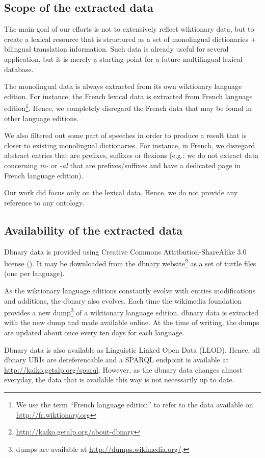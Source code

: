 \documentclass[sw]{iosart2c}
\begin{document}
\subsection{Scope of the extracted data}

The main goal of our efforts is not to extensively reflect wiktionary data, but to create a lexical resource that is structured as a set of monolingual dictionaries + bilingual translation information. Such data is already useful for several application, but it is merely a starting point for a future multilingual lexical database.

The monolingual data is always extracted from its own wiktionary language edition. For instance, the French lexical data is extracted from French language edition\footnote{We use the term ``French language edition'' to refer to the data available on \url{http://fr.wiktionary.org}}. Hence, we completely disregard the French data that may be found in other language editions.

We also filtered out some part of speeches in order to produce a result that is closer to existing monolingual dictionaries. For instance, in French, we disregard abstract entries that are prefixes, suffixes or flexions (e.g.: we do not extract data concerning \textit{in-} or \textit{-al} that are prefixes/suffixes and have a dedicated page in French language edition). 

Our work did focus only on the lexical data. Hence, we do not provide any reference to any ontology.

\subsection{Availability of the extracted data}

Dbnary data is provided using Creative Commons Attribution-ShareAlike 3.0 license (\ccbysa). It may be downloaded from the dbnary website\footnote{\url{http://kaiko.getalp.org/about-dbnary}} as a set of turtle files (one per language).

As the wiktionary language editions constantly evolve with entries modifications and additions, the dbnary also evolves. Each time the wikimedia foundation provides a new dump\footnote{dumps are available at \url{http://dumps.wikimedia.org/}.} of a wiktionary language edition, dbnary data is extracted with the new dump and made available online. At the time of writing, the dumps are updated about once every ten days for each language.

Dbnary data is also available as Linguistic Linked Open Data (LLOD). Hence, all dbnary URIs are dereferencable and a SPARQL endpoint is available at \url{http://kaiko.getalp.org/sparql}. However, as the dbnary data changes almost everyday, the data that is available this way is not necessarily up to date.
\end{document}
